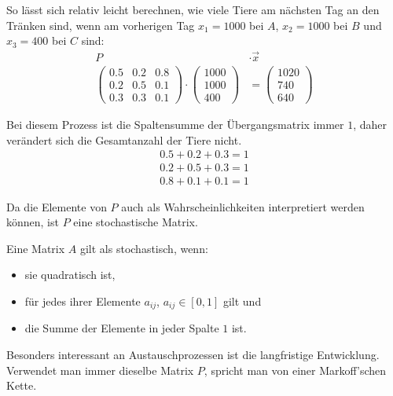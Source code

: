 \begin{flushleft}
So lässt sich relativ leicht berechnen, wie viele Tiere am nächsten Tag an den Tränken sind, wenn am vorherigen Tag $x_1=1000$ bei $A$, $x_2=1000$ bei $B$ und $x_3=400$ bei $C$ sind:
\begin{align}
    P&\cdot\vec{x} \\
    \begin{pmatrix}
        0.5 & 0.2 & 0.8 \\
        0.2 & 0.5 & 0.1 \\
        0.3 & 0.3 & 0.1
    \end{pmatrix}\cdot
    \begin{pmatrix}
        1000 \\
        1000 \\
        400
    \end{pmatrix}&=
    \begin{pmatrix}
        1020 \\
        740 \\
        640
    \end{pmatrix}
\end{align}

Bei diesem Prozess ist die Spaltensumme der Übergangsmatrix immer $1$, daher verändert sich die Gesamtanzahl der Tiere nicht.
\begin{align}
    0.5+0.2+0.3=1 \\
    0.2+0.5+0.3=1 \\
    0.8+0.1+0.1=1
\end{align}

Da die Elemente von $P$ auch als Wahrscheinlichkeiten interpretiert werden können, ist $P$ eine stochastische Matrix.

Eine Matrix $A$ gilt als stochastisch, wenn:
\begin{itemize}
    \item {
        sie quadratisch ist,
    }
    \item {
        für jedes ihrer Elemente $a_{ij}$, $a_{ij} \in [0,1]$ gilt und
    }
    \item {
        die Summe der Elemente in jeder Spalte $1$ ist.
    }
\end{itemize}

Besonders interessant an Austauschprozessen ist die langfristige Entwicklung.
Verwendet man immer dieselbe Matrix $P$, spricht man von einer Markoff'schen Kette.
\end{flushleft}

